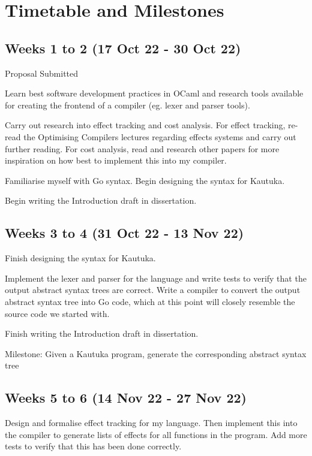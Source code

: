 \documentclass[12pt,a4paper,twoside,openright]{report}
\begin{document}
\section*{Timetable and Milestones}

\subsection*{Weeks 1 to 2 (17 Oct 22 - 30 Oct 22)}
Proposal Submitted

Learn best software development practices in OCaml and research tools available for creating the frontend of a compiler (eg. lexer and parser tools). 

Carry out research into effect tracking and cost analysis. For effect tracking, re-read the Optimising Compilers lectures regarding effects systems \cite{Optimising-Compilers-Lecture-13-Effect-Systems} and carry out further reading. For cost analysis, read \cite{10.1145/361002.361016} and research other papers for more inspiration on how best to implement this into my compiler.

Familiarise myself with Go syntax. Begin designing the syntax for Kautuka.

Begin writing the Introduction draft in dissertation.

\subsection*{Weeks 3 to 4 (31 Oct 22 - 13 Nov 22)}

Finish designing the syntax for Kautuka. 

Implement the lexer and parser for the language and write tests to verify that the output abstract syntax trees are correct. Write a compiler to convert the output abstract syntax tree into Go code, which at this point will closely resemble the source code we started with. 

Finish writing the Introduction draft in dissertation.

Milestone: Given a Kautuka program, generate the corresponding abstract syntax tree 

\subsection*{Weeks 5 to 6 (14 Nov 22 - 27 Nov 22)}

Design and formalise effect tracking for my language. Then implement this into the compiler to generate lists of effects for all functions in the program. Add more tests to verify that this has been done correctly.
\end{document}
